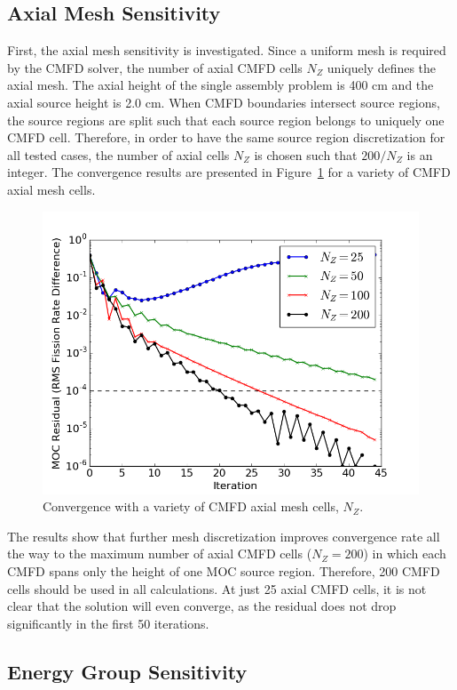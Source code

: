 \subsection{Axial Mesh Sensitivity}
First, the axial mesh sensitivity is investigated. Since a uniform mesh is required by the \ac{CMFD} solver, the number of axial \ac{CMFD} cells $N_Z$ uniquely defines the axial mesh. The axial height of the single assembly problem is 400 cm and the axial source height is 2.0 cm. When \ac{CMFD} boundaries intersect source regions, the source regions are split such that each source region belongs to uniquely one \ac{CMFD} cell. Therefore, in order to have the same source region discretization for all tested cases, the number of axial cells $N_Z$ is chosen such that $200 / N_Z$ is an integer. The convergence results are presented in Figure~\ref{fig:cmfd-axial-cells} for a variety of \ac{CMFD} axial mesh cells. 

\begin{figure}[h!]
	\centering
	\includegraphics[width=0.7\linewidth]{figures/results/sensitivity/cmfd-axial-cells.png}
	\caption[]{Convergence with a variety of \ac{CMFD} axial mesh cells, $N_Z$.}
	\label{fig:cmfd-axial-cells}
\end{figure}

The results show that further mesh discretization improves convergence rate all the way to the maximum number of axial \ac{CMFD} cells ($N_Z = 200$) in which each \ac{CMFD} spans only the height of one \ac{MOC} source region. Therefore, 200 \ac{CMFD} cells should be used in all calculations. At just 25 axial \ac{CMFD} cells, it is not clear that the solution will even converge, as the residual does not drop significantly in the first 50 iterations.

\newpage
\subsection{Energy Group Sensitivity}

